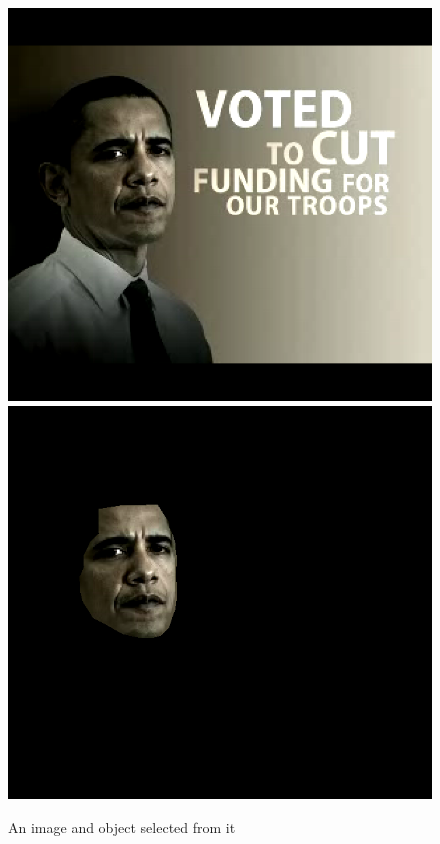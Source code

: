 \documentclass[12pt]{article}
\begin{document}
\begin{figure}[ht]
\centering
\caption{An image and object selected from it}
\includegraphics{jm-sep25-promise1.png}
\includegraphics{obamaface.png}
\label{fig:jmfamily}
\end{figure}
\end{document}
